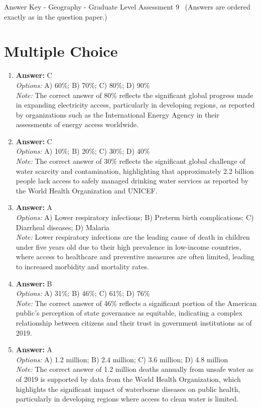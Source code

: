 \documentclass[12pt]{article}
\begin{document}
\begin{center}
Answer Key - Geography - Graduate Level Assessment 9 \
\small (Answers are ordered exactly as in the question paper.)
\end{center}

\section*{Multiple Choice}
\begin{enumerate}[label=\arabic*.]
\item \textbf{Answer:} C
\\ \textit{Options:} A) 60\%; B) 70\%; C) 80\%; D) 90\%
\\ \textit{Note:} The correct answer of 80\% reflects the significant global progress made in expanding electricity access, particularly in developing regions, as reported by organizations such as the International Energy Agency in their assessments of energy access worldwide.
\item \textbf{Answer:} C
\\ \textit{Options:} A) 10\%; B) 20\%; C) 30\%; D) 40\%
\\ \textit{Note:} The correct answer of 30\% reflects the significant global challenge of water scarcity and contamination, highlighting that approximately 2.2 billion people lack access to safely managed drinking water services as reported by the World Health Organization and UNICEF.
\item \textbf{Answer:} A
\\ \textit{Options:} A) Lower respiratory infections; B) Preterm birth complications; C) Diarrheal diseases; D) Malaria
\\ \textit{Note:} Lower respiratory infections are the leading cause of death in children under five years old due to their high prevalence in low-income countries, where access to healthcare and preventive measures are often limited, leading to increased morbidity and mortality rates.
\item \textbf{Answer:} B
\\ \textit{Options:} A) 31\%; B) 46\%; C) 61\%; D) 76\%
\\ \textit{Note:} The correct answer of 46\% reflects a significant portion of the American public's perception of state governance as equitable, indicating a complex relationship between citizens and their trust in government institutions as of 2019.
\item \textbf{Answer:} A
\\ \textit{Options:} A) 1.2 million; B) 2.4 million; C) 3.6 million; D) 4.8 million
\\ \textit{Note:} The correct answer of 1.2 million deaths annually from unsafe water as of 2019 is supported by data from the World Health Organization, which highlights the significant impact of waterborne diseases on public health, particularly in developing regions where access to clean water is limited.
\end{enumerate}
\end{document}
